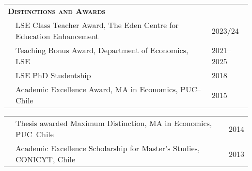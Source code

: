 \begin{tabular}{lll}
	
	\multicolumn{3}{l}{
		\large
		\textbf{%
			\textsc{%
				Distinctions and Awards
			}
		}
	}
	\\[2ex]
	
	  \indent

	& LSE Class Teacher Award, The Eden Centre for Education Enhancement
	& 2023/24
	\\[.5ex]
	
	& Teaching Bonus Award, Department of Economics, LSE
	& 2021--2025
	\\[.5ex]
	
	& LSE PhD Studentship
	& 2018
	\\[.5ex]
	
	& Academic Excellence Award, MA in Economics, PUC--Chile
	& 2015
	
\end{tabular}

\begin{tabular}{lll}

	\indent
	
	& Thesis awarded Maximum Distinction, MA in Economics, PUC--Chile
	& 2014
	\\[.5ex]
	
	& Academic Excellence Scholarship for Master's Studies, CONICYT, Chile
	& 2013
	
\end{tabular}
